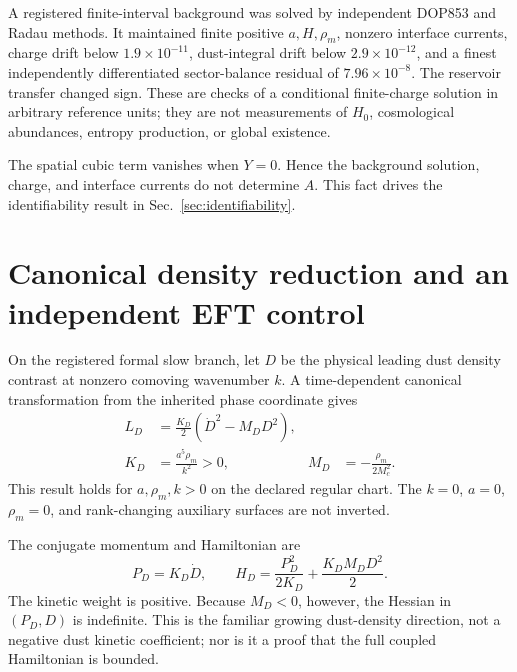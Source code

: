 \documentclass[aps,prd,reprint,superscriptaddress,nofootinbib,floatfix]{revtex4-2}
\begin{document}
A registered finite-interval background was solved by independent DOP853 and
Radau methods.  It maintained finite positive \(a,H,\rho_m\), nonzero
interface currents, charge drift below \(1.9\times10^{-11}\), dust-integral
drift below \(2.9\times10^{-12}\), and a finest independently differentiated
sector-balance residual of \(7.96\times10^{-8}\).  The reservoir transfer
changed sign.  These are checks of a conditional finite-charge solution in
arbitrary reference units; they are not measurements of \(H_0\), cosmological
abundances, entropy production, or global existence.

The spatial cubic term vanishes when \(Y=0\).  Hence the background solution,
charge, and interface currents do not determine \(A\).  This fact drives the
identifiability result in Sec.~\ref{sec:identifiability}.

\section{Canonical density reduction and an independent EFT control}
\label{sec:density}

On the registered formal slow branch, let \(D\) be the physical leading dust
density contrast at nonzero comoving wavenumber \(k\).  A time-dependent
canonical transformation from the inherited phase coordinate gives
\begin{align}
 L_D&=\frac{K_D}{2}\left(\dot D^2-M_DD^2\right),\\
 K_D&=\frac{a^5\rho_m}{k^2}>0,&
 M_D&=-\frac{\rho_m}{2M_c^2}.
 \label{eq:density-action}
\end{align}
This result holds for \(a,\rho_m,k>0\) on the declared regular chart.  The
\(k=0\), \(a=0\), \(\rho_m=0\), and rank-changing auxiliary surfaces are not
inverted.

The conjugate momentum and Hamiltonian are
\begin{equation}
 P_D=K_D\dot D,\qquad
 H_D=\frac{P_D^2}{2K_D}+\frac{K_DM_DD^2}{2}.
 \label{eq:density-hamiltonian}
\end{equation}
The kinetic weight is positive.  Because \(M_D<0\), however, the Hessian in
\((P_D,D)\) is indefinite.  This is the familiar growing dust-density
direction, not a negative dust kinetic coefficient; nor is it a proof that the
full coupled Hamiltonian is bounded.
\end{document}

